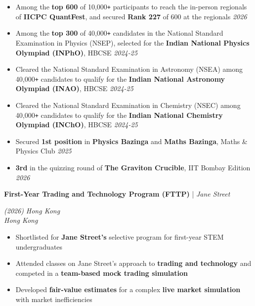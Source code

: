 \documentclass[11pt]{article}
\newcommand{\yr}[1]{\unskip\nobreak\hfill\mbox{\sl\small #1}}
\newcommand{\xfill}[2][1ex]{%
	\dimen0=#2\advance\dimen0 by #1
	\leaders\hrule height \dimen0 depth -#1\hfill
}
\renewcommand{\section}[1]{%
	\par\vspace{9pt}
	{\color{Blue}{\Large\scshape\raggedright #1\xfill[0pt]{0.5pt}}}\par\vspace{3pt}
}
\newcommand{\filldate}[1]{%
	\def\tempdate{#1}%
	\ifx\tempdate\empty\else\strut\hfill{\small\textit{(#1)}}\fi
}
\renewcommand{\subsection}[4]{%
	\def\temp{#4}%
	\par\vspace{5pt}
	{%
		\large
		{\color{Green}\textbf{#1}} | {\sl #2}\filldate{#3}%
		\ifx\temp\empty
		\else
		{\\[0.1em]\fontsize{11}{13.2}\selectfont\sl #4}%
		\fi
	}%
}
\begin{document}
\section{Olympiads \& Competitions}
\begin{itemize}
    \item Among the \textbf{top 600} of 10,000\texttt{+} participants to reach the in-person regionals of \textbf{IICPC QuantFest}, and secured \textbf{Rank 227} of 600 at the regionals \yr{2026}
    \item Among the \textbf{top 300} of 40,000\texttt{+} candidates in the National Standard Examination in Physics (NSEP), selected for the \textbf{Indian National Physics Olympiad (INPhO)}, HBCSE \yr{2024-25}
    \item Cleared the National Standard Examination in Astronomy (NSEA) among 40,000\texttt{+} candidates to qualify for the \textbf{Indian National Astronomy Olympiad (INAO)}, HBCSE \yr{2024-25}
    \item Cleared the National Standard Examination in Chemistry (NSEC) among 40,000\texttt{+} candidates to qualify for the \textbf{Indian National Chemistry Olympiad (INChO)}, HBCSE \yr{2024-25}
    \item Secured \textbf{1st position} in \textbf{Physics Bazinga} and \textbf{Maths Bazinga}, Maths \& Physics Club \yr{2025}
    \item \textbf{3rd} in the quizzing round of \textbf{The Graviton Crucible}, IIT Bombay Edition \yr{2026}
\end{itemize}

\section{Professional Experience}

\subsection{First-Year Trading and Technology Program (FTTP)}{Jane Street}{2026}{\textit{Hong Kong}}
\begin{itemize}
    \item Shortlisted for \textbf{Jane Street's} selective program for first-year STEM undergraduates
    \item Attended classes on Jane Street's approach to \textbf{trading and technology} and competed in a \textbf{team-based mock trading simulation}
    \item Developed \textbf{fair-value estimates} for a complex \textbf{live market simulation} with market inefficiencies
\end{itemize}
\end{document}
